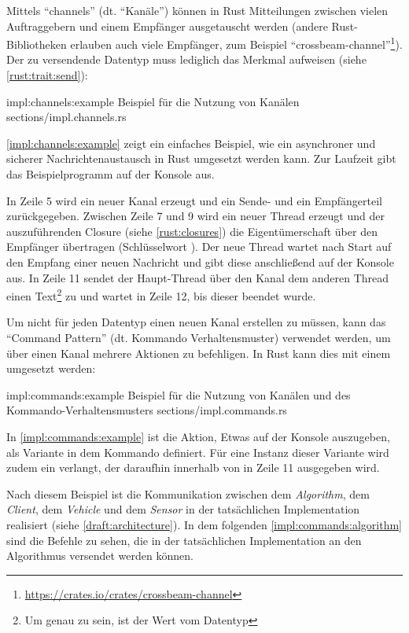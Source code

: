 Mittels \enquote{channels} (dt. \enquote{Kanäle}) können in Rust Mitteilungen zwischen vielen Auftraggebern und einem Empfänger ausgetauscht werden (andere Rust-Bibliotheken erlauben auch viele Empfänger, zum Beispiel \enquote{crossbeam-channel}\footnote{\url{https://crates.io/crates/crossbeam-channel}}).
Der zu versendende Datentyp muss lediglich das Merkmal  aufweisen (siehe \autoref{rust:trait:send}):

\rustcinclude
	{impl:channels:example}
	{Beispiel für die Nutzung von Kanälen}
	{sections/impl.channels.rs}

\autoref{impl:channels:example} zeigt ein einfaches Beispiel, wie ein asynchroner  und sicherer Nachrichtenaustausch in Rust umgesetzt werden kann.
Zur Laufzeit gibt das Beispielprogramm  auf der Konsole aus.

In Zeile 5 wird ein neuer Kanal erzeugt und ein Sende- und ein Empfängerteil zurückgegeben.
Zwischen Zeile 7 und 9 wird ein neuer Thread erzeugt und der auszuführenden Closure (siehe \autoref{rust:closures}) die Eigentümerschaft über den Empfänger übertragen (Schlüsselwort ).
Der neue Thread wartet nach Start auf den Empfang einer neuen Nachricht und gibt diese anschließend auf der Konsole aus.
In Zeile 11 sendet der Haupt-Thread über den Kanal dem anderen Thread einen Text\footnote{Um genau zu sein, ist der Wert vom Datentyp  } zu und wartet in Zeile 12, bis dieser beendet wurde.

Um nicht für jeden Datentyp einen neuen Kanal erstellen zu müssen, kann das \enquote{Command Pattern} (dt. Kommando Verhaltensmuster) \cite[153]{goll2014architektur} verwendet werden, um über einen Kanal mehrere Aktionen zu befehligen.
In Rust kann dies mit einem  umgesetzt werden:

\rustcinclude
	{impl:commands:example}
	{Beispiel für die Nutzung von Kanälen und des Kommando-Verhaltensmusters}
	{sections/impl.commands.rs}
	
In \autoref{impl:commands:example} ist die Aktion, Etwas auf der Konsole auszugeben, als Variante  in dem Kommando definiert.
Für eine Instanz dieser Variante wird zudem ein  verlangt, der daraufhin innerhalb von  in Zeile 11 ausgegeben wird.

Nach diesem Beispiel ist die Kommunikation zwischen dem \textit{Algorithm}, dem \textit{Client}, dem \textit{Vehicle} und dem \textit{Sensor} in der tatsächlichen Implementation realisiert (siehe \autoref{draft:architecture}).
In dem folgenden \autoref{impl:commands:algorithm} sind die Befehle zu sehen, die in der tatsächlichen Implementation an den Algorithmus versendet werden können.

